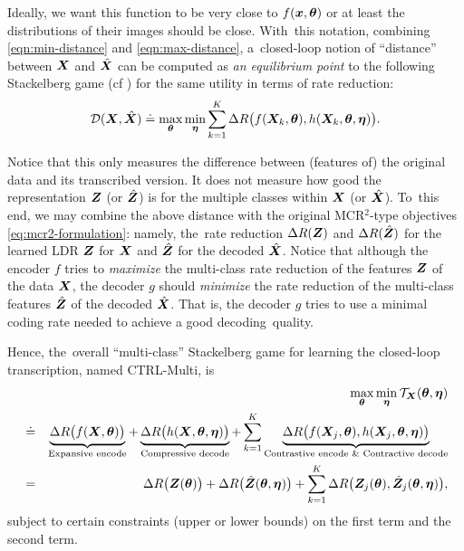 \documentclass[../../book-main.tex]{subfiles}
\begin{document}
Ideally, we want this function to be very close to $f(\bm{x}, \bm \theta)$ or at least the distributions of their images should be close. With~this notation, combining \eqref{eqn:min-distance} and \eqref{eqn:max-distance}, a~closed-loop notion of ``distance'' between $\bm{X}$ and $\hat {\bm{X}}$ can be computed as {\em an equilibrium point} to the following Stackelberg game (cf ) for the same utility in terms of rate reduction:%
\begin{equation}
\mathcal{D}(\bm{X}, \hat {\bm{X}}) \doteq  \max_{\bm \theta} \min_{\bm \eta} \sum_{k=1}^K \Delta R\big(f(\bm{X}_k,\bm \theta), h(\bm{X}_k,\bm \theta,\bm \eta)\big).
    \label{eq:MCR2-GAN-pair}
\end{equation}

Notice that this only measures the difference between (features of) the original data and its transcribed version. It does not measure how good the representation $\bm{Z}$ (or $\hat {\bm{Z}}$) is for the multiple classes within $\bm{X}$ (or $\hat {\bm{X}}$). To~this end, we may combine the above distance with the original MCR$^2$-type objectives  \eqref{eq:mcr2-formulation}: namely, the~rate reduction $\Delta R(\bm{Z})$ and $\Delta R(\hat {\bm{Z}})$ for the learned LDR $\bm{Z}$ for $\bm{X}$ and $\hat {\bm{Z}}$ for the decoded $\hat {\bm{X}}$. Notice that although the encoder $f$ tries to {\em maximize} the multi-class rate reduction of the features $\bm{Z}$ of the data $\bm{X}$,  the decoder $g$ should {\em minimize} the rate reduction of the multi-class  features $\hat {\bm{Z}}$ of the decoded $\hat {\bm{X}}$. That is, the decoder $g$ tries to use a minimal  coding rate needed to achieve a good decoding~quality. 

Hence, the~overall ``multi-class''  Stackelberg game for learning the closed-loop transcription, named CTRL-Multi, is
\begin{eqnarray}
&&\max_{\bm \theta} \min_{\bm \eta} \mathcal{T}_{\bm{X}}(\bm \theta, \bm \eta) \\
&\doteq& \underbrace{\Delta R\big(f(\bm{X},\bm \theta)\big)}_{\text{Expansive encode}} + \underbrace{\Delta R\big(h(\bm{X},\bm \theta, \bm \eta)\big)}_{\text{Compressive decode}} + \sum_{k=1}^K \underbrace{\Delta R\big(f(\bm{X}_j,\bm \theta), h(\bm{X}_j,\bm \theta,\bm \eta)\big)}_{\text{Contrastive encode \& Contractive decode}} \nonumber \\
&=& \Delta R\big(\bm{Z}(\bm \theta) \big) + \Delta R\big(\hat {\bm{Z}}(\bm \theta, \bm \eta)\big) + \sum_{k=1}^K \Delta R\big(\bm{Z}_j(
\bm \theta), \hat {\bm{Z}}_j(\bm \theta, \bm \eta) \big),
    \label{eq:MCR2-GAN-objective}
\end{eqnarray}
subject to certain constraints (upper or lower bounds) on the first term and the second term.  %
\end{document}
